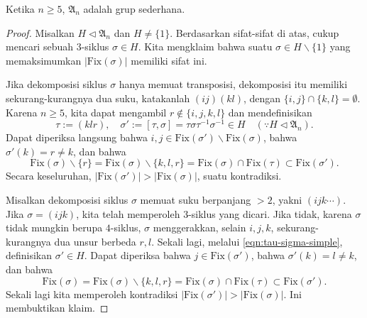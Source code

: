 \begin{theorem}[É.\ Galois]\label{prop:A_n-simple}
	Ketika $n \geq 5$, $\mathfrak{A}_n$ adalah grup sederhana.
\end{theorem}
\begin{proof}
	Misalkan $H \lhd \mathfrak{A}_n$ dan $H \neq \{1\}$. Berdasarkan sifat-sifat di atas, cukup mencari sebuah $3$-siklus $\sigma \in H$. Kita mengklaim bahwa suatu $\sigma \in H \smallsetminus \{1\}$ yang memaksimumkan $\left|\text{Fix}(\sigma)\right|$ memiliki sifat ini.
	
	Jika dekomposisi siklus $\sigma$ hanya memuat transposisi, dekomposisi itu memiliki sekurang-kurangnya dua suku, katakanlah $(i j) (k l)$, dengan $\{i,j\} \cap \{k,l\} = \emptyset$. Karena $n \geq 5$, kita dapat mengambil $r \notin \{i,j,k, l\}$ dan mendefinisikan
	\begin{equation}\label{eqn:tau-sigma-simple}
		\tau := (k l r), \quad \sigma' := [\tau, \sigma] = \tau\sigma\tau^{-1}\sigma^{-1} \in H \quad (\because H \lhd \mathfrak{A}_n).
	\end{equation}
	Dapat diperiksa langsung bahwa $i,j \in \text{Fix}(\sigma') \smallsetminus \text{Fix}(\sigma)$, bahwa $\sigma'(k) = r \neq k$, dan bahwa
	\[ \text{Fix}(\sigma) \smallsetminus \{r\} = \text{Fix}(\sigma) \smallsetminus \{k, l, r\} = \text{Fix}(\sigma) \cap \text{Fix}(\tau) \subset \text{Fix}(\sigma'). \]
	Secara keseluruhan, $\left|\text{Fix}(\sigma')\right| > \left|\mathrm{Fix}(\sigma)\right|$, suatu kontradiksi.
	
	Misalkan dekomposisi siklus $\sigma$ memuat suku berpanjang $>2$, yakni $(i j k \cdots)$. Jika $\sigma = (i j k)$, kita telah memperoleh $3$-siklus yang dicari. Jika tidak, karena $\sigma$ tidak mungkin berupa $4$-siklus, $\sigma$ menggerakkan, selain $i,j,k$, sekurang-kurangnya dua unsur berbeda $r,l$. Sekali lagi, melalui \eqref{eqn:tau-sigma-simple}, definisikan $\sigma' \in H$. Dapat diperiksa bahwa $j \in \text{Fix}(\sigma')$, bahwa $\sigma'(k) = l \neq k$, dan bahwa
	\[ \text{Fix}(\sigma) = \text{Fix}(\sigma) \smallsetminus \{k,l,r\} = \text{Fix}(\sigma) \cap \text{Fix}(\tau) \subset \text{Fix}(\sigma'). \]
	Sekali lagi kita memperoleh kontradiksi $\left|\text{Fix}(\sigma')\right| > \left|\mathrm{Fix}(\sigma)\right|$. Ini membuktikan klaim.
\end{proof}

